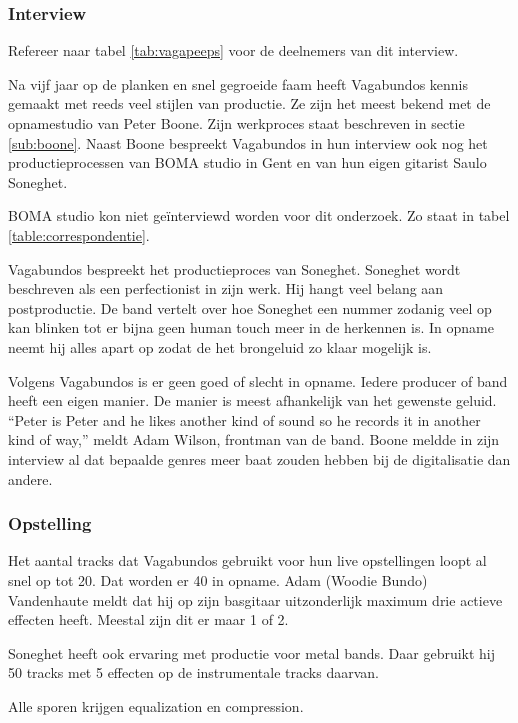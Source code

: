 \subsubsection*{Interview}

Refereer naar tabel \ref{tab:vagapeeps} voor de deelnemers van dit interview.

Na vijf jaar op de planken en snel gegroeide faam heeft Vagabundos kennis gemaakt met reeds veel stijlen van productie. Ze zijn het meest bekend met de opnamestudio van Peter Boone. Zijn werkproces staat beschreven in sectie \ref{sub:boone}. Naast Boone bespreekt Vagabundos in hun interview ook nog het productieprocessen van BOMA studio in Gent en van hun eigen gitarist Saulo Soneghet. \autocite{vagabundos}

BOMA studio kon niet geïnterviewd worden voor dit onderzoek. Zo staat in tabel \ref{table:correspondentie}.

Vagabundos bespreekt het productieproces van Soneghet. Soneghet wordt beschreven als een perfectionist in zijn werk. Hij hangt veel belang aan postproductie. De band vertelt over hoe Soneghet een nummer zodanig veel op kan blinken tot er bijna geen human touch meer in de herkennen is. In opname neemt hij alles apart op zodat de het brongeluid zo klaar mogelijk is. \autocite{vagabundos}

Volgens Vagabundos is er geen goed of slecht in opname. Iedere producer of band heeft een eigen manier. De manier is meest afhankelijk van het gewenste geluid. ``Peter is Peter and he likes another kind of sound so he records it in another kind of way,'' meldt Adam Wilson, frontman van de band. \autocite{vagabundos} Boone meldde in zijn interview al dat bepaalde genres meer baat zouden hebben bij de digitalisatie dan andere.  \autocite{peterboone}

\subsubsection*{Opstelling}

Het aantal tracks dat Vagabundos gebruikt voor hun live opstellingen loopt al snel op tot 20. Dat worden er 40 in opname. Adam (Woodie Bundo) Vandenhaute meldt dat hij op zijn basgitaar uitzonderlijk maximum drie actieve effecten heeft. Meestal zijn dit er maar 1 of 2.

Soneghet heeft ook ervaring met productie voor metal bands. Daar gebruikt hij 50 tracks met 5 effecten op de instrumentale tracks daarvan. 

Alle sporen krijgen equalization en compression.


